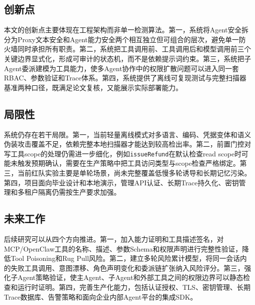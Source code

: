 \documentclass[UTF8,zihao=-4,scheme=chinese,fontset=none]{ctexart}
\newcommand{\code}[1]{{\ttfamily\small\nolinkurl{#1}}}
\begin{document}
\subsection{创新点}

本文的创新点主要体现在工程架构而非单一检测算法。第一，系统将Agent安全拆分为Proxy文本安全和Agent能力安全两个相互独立但可组合的层次，避免单一防火墙同时承担所有职责。第二，系统把工具调用前、工具调用后和模型调用前三个关键边界显式化，形成可审计的状态机，而不是依赖提示词约束。第三，系统把子Agent委派建模为工具能力，使多Agent协作中的权限扩散问题可以进入同一套RBAC、参数验证和Trace体系。第四，系统提供了离线可复现测试与完整扫描器基准两种口径，既满足论文复核，又能展示实际部署能力。

\subsection{局限性}

系统仍存在若干局限。第一，当前轻量离线模式对多语言、编码、凭据变体和语义伪装攻击覆盖不足，依赖完整本地扫描器才能达到较高检出率。第二，前置门控对写工具scope的处理仍需进一步细化，例如\code{issueRefund}在默认检查read scope时可能未触发预期确认，需要在生产策略中把工具访问类型与scope检查严格绑定。第三，当前红队实验主要是单轮场景，尚未完整覆盖低慢多轮诱导和长期记忆污染。第四，项目面向毕业设计和本地演示，管理API认证、长期Trace持久化、密钥管理和多租户隔离仍需按生产要求加强。

\subsection{未来工作}

后续研究可以从四个方向推进。第一，加入能力证明和工具描述签名，对MCP/OpenClaw工具的名称、描述、参数Schema和权限声明进行完整性验证，降低Tool Poisoning和Rug Pull风险。第二，建立多轮风险累计模型，将同一会话内的失败工具调用、意图漂移、角色声明变化和委派链扩张纳入风险评分。第三，强化子Agent策略验证，使主Agent、子Agent和外部工具之间的权限边界可以静态检查和运行时证明。第四，完善生产化能力，包括认证授权、TLS、密钥管理、长期Trace数据库、告警策略和面向企业内部Agent平台的集成SDK。
\end{document}
